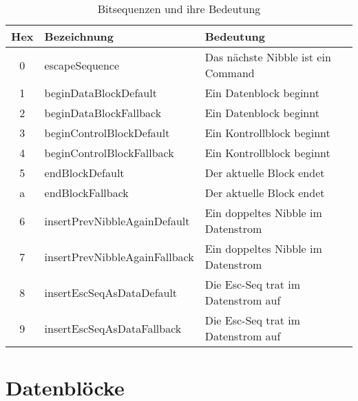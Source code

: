\begin{table}[H]
    \center
    \def\arraystretch{1.3}
    \begin{tabular}{|c|l|l|l|}
        \rowcolor{gray!50}
        \hline
        \textbf{Hex} & \textbf{Bezeichnung}          & \textbf{Bedeutung}                 \\
        \hline
        0            & escapeSequence                & Das nächste Nibble ist ein Command \\
        1            & beginDataBlockDefault         & Ein Datenblock beginnt             \\
        2            & beginDataBlockFallback        & Ein Datenblock beginnt             \\
        3            & beginControlBlockDefault      & Ein Kontrollblock beginnt          \\
        4            & beginControlBlockFallback     & Ein Kontrollblock beginnt          \\
        5            & endBlockDefault               & Der aktuelle Block endet           \\
        a            & endBlockFallback              & Der aktuelle Block endet           \\
        6            & insertPrevNibbleAgainDefault  & Ein doppeltes Nibble im Datenstrom \\
        7            & insertPrevNibbleAgainFallback & Ein doppeltes Nibble im Datenstrom \\
        8            & insertEscSeqAsDataDefault     & Die Esc-Seq trat im Datenstrom auf \\
        9            & insertEscSeqAsDataFallback    & Die Esc-Seq trat im Datenstrom auf \\
        \hline
    \end{tabular}
    \caption{Bitsequenzen und ihre Bedeutung}
    \label{tab:escape_sequences}
\end{table}

\section{Datenblöcke}